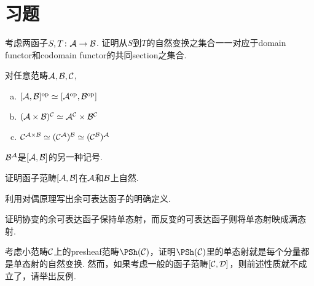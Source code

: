 \section{习题}
\begin{ex}
  考虑两函子$S,T\colon{\cal A}\to{\cal B}$. 证明从$S$到$T$的自然变换之集合一一对应于domain functor和codomain functor的共同section之集合.
\end{ex}
\begin{ex}
  对任意范畴${\cal A},{\cal B},{\cal C}$,
  \begin{enumerate}[a)]
    \item $[{\cal A},{\cal B}]^{\operatorname{op}}\simeq[{\cal A}^{\operatorname{op}},{\cal B}^{\operatorname{op}}]$
    \item $({\cal A}\times{\cal B})^{{\cal C}}\simeq{\cal A}^{{\cal C}}\times{\cal B}^{{\cal C}}$
    \item ${\cal C}^{{\cal A}\times{\cal B}}\simeq({\cal C}^{{\cal A}})^{{\cal B}}\simeq({\cal C}^{{\cal B}})^{{\cal A}}$
  \end{enumerate}
\end{ex}
\begin{rec}
  ${\cal B}^{{\cal A}}$是$[{\cal A},{\cal B}]$的另一种记号.
\end{rec}
\begin{ex}
  证明函子范畴$[{\cal A},{\cal B}]$在${\cal A}$和${\cal B}$上自然.
\end{ex}
\begin{ex}
  利用对偶原理写出余可表达函子的明确定义.
\end{ex}
\begin{ex}
  证明协变的余可表达函子保持单态射，而反变的可表达函子则将单态射映成满态射.
\end{ex}
\begin{ex}
  考虑小范畴${\cal C}$上的presheaf范畴$\PSh(\Cc)$，证明$\PSh(\Cc)$里的单态射就是每个分量都是单态射的自然变换.
  然而，如果考虑一般的函子范畴$[{\cal C},{\cal D}]$，则前述性质就不成立了，请举出反例.
\end{ex}
